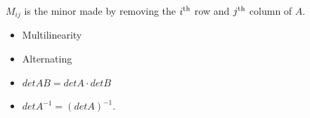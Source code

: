 \documentclass[11pt]{article}
\begin{document}
		$M_{ij}$ is the minor made by removing the $i\textsuperscript{th}$ row and $j\textsuperscript{th}$ column of $A$.
		
		\begin{itemize}
			\item Multilinearity
			\item Alternating 
			\item $detAB = detA\cdot detB$
			\item $detA^{-1}=(detA)^{-1}$.
		\end{itemize}
		
%		
%		


\end{document}
